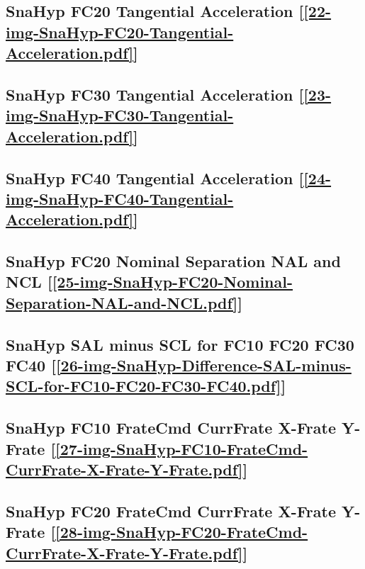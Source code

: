 \subsection       {SnaHyp FC20 Tangential Acceleration
	[\ref      {22-img-SnaHyp-FC20-Tangential-Acceleration.pdf}] }
\label{ssec-22-img-SnaHyp-FC20-Tangential-Acceleration.pdf}

\subsection       {SnaHyp FC30 Tangential Acceleration
	[\ref      {23-img-SnaHyp-FC30-Tangential-Acceleration.pdf}] }
\label{ssec-23-img-SnaHyp-FC30-Tangential-Acceleration.pdf}

\subsection       {SnaHyp FC40 Tangential Acceleration
	[\ref      {24-img-SnaHyp-FC40-Tangential-Acceleration.pdf}] }
\label{ssec-24-img-SnaHyp-FC40-Tangential-Acceleration.pdf}

\subsection       {SnaHyp FC20 Nominal Separation NAL and NCL
	[\ref      {25-img-SnaHyp-FC20-Nominal-Separation-NAL-and-NCL.pdf}] }
\label{ssec-25-img-SnaHyp-FC20-Nominal-Separation-NAL-and-NCL.pdf}

\subsection       {SnaHyp SAL minus SCL for FC10 FC20 FC30 FC40
	[\ref      {26-img-SnaHyp-Difference-SAL-minus-SCL-for-FC10-FC20-FC30-FC40.pdf}] }
\label{ssec-26-img-SnaHyp-Difference-SAL-minus-SCL-for-FC10-FC20-FC30-FC40.pdf}


\subsection       {SnaHyp FC10 FrateCmd CurrFrate X-Frate Y-Frate
	[\ref      {27-img-SnaHyp-FC10-FrateCmd-CurrFrate-X-Frate-Y-Frate.pdf}] }
\label{ssec-27-img-SnaHyp-FC10-FrateCmd-CurrFrate-X-Frate-Y-Frate.pdf}

\subsection       {SnaHyp FC20 FrateCmd CurrFrate X-Frate Y-Frate
	[\ref      {28-img-SnaHyp-FC20-FrateCmd-CurrFrate-X-Frate-Y-Frate.pdf}] }
\label{ssec-28-img-SnaHyp-FC20-FrateCmd-CurrFrate-X-Frate-Y-Frate.pdf}

